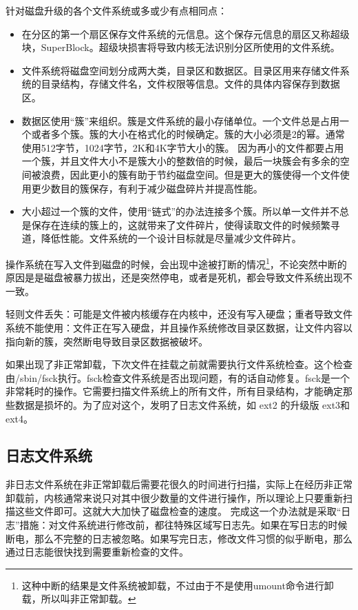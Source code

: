针对磁盘升级的各个文件系统或多或少有点相同点：
\begin{itemize}
\item 在分区的第一个扇区保存文件系统的元信息。这个保存元信息的扇区又称超级块，SuperBlock。超级块损害将导致内核无法识别分区所使用的文件系统。
\item 文件系统将磁盘空间划分成两大类，目录区和数据区。目录区用来存储文件系统的目录结构，存储文件名，文件权限等信息。文件的具体内容保存到数据区。
\item 数据区使用“簇”来组织。簇是文件系统的最小存储单位。一个文件总是占用一个或者多个簇。簇的大小在格式化的时候确定。簇的大小必须是2的幂。通常使用512字节，1024字节，2K和4K字节大小的簇。
因为再小的文件都要占用一个簇，并且文件大小不是簇大小的整数倍的时候，最后一块簇会有多余的空间被浪费，因此更小的簇有助于节约磁盘空间。但是更大的簇使得一个文件使用更少数目的簇保存，有利于减少磁盘碎片并提高性能。
\item 大小超过一个簇的文件，使用“链式”的办法连接多个簇。所以单一文件并不总是保存在连续的簇上的，这就带来了文件碎片，使得读取文件的时候频繁寻道，降低性能。文件系统的一个设计目标就是尽量减少文件碎片。
\end{itemize}

操作系统在写入文件到磁盘的时候，会出现中途被打断的情况\footnote{这种中断的结果是文件系统被卸载，不过由于不是使用umount命令进行卸载，所以叫非正常卸载。}，不论突然中断的原因是是磁盘被暴力拔出，还是突然停电，或者是死机，都会导致文件系统出现不一致。

轻则文件丢失：可能是文件被内核缓存在内核中，还没有写入硬盘；重者导致文件系统不能使用：文件正在写入硬盘，并且操作系统修改目录区数据，让文件内容以指向新的簇，突然断电导致目录区数据被破坏。

如果出现了非正常卸载，下次文件在挂载之前就需要执行文件系统检查。这个检查由/sbin/fsck执行。fsck检查文件系统是否出现问题，有的话自动修复。fsck是一个非常耗时的操作。它需要扫描文件系统上的所有文件，所有目录结构，才能确定那些数据是损坏的。为了应对这个，发明了日志文件系统，如 ext2 的升级版 ext3和ext4。

\subsection{日志文件系统}

非日志文件系统在非正常卸载后需要花很久的时间进行扫描，实际上在经历非正常卸载前，内核通常来说只对其中很少数量的文件进行操作，所以理论上只要重新扫描这些文件即可。这就大大加快了磁盘检查的速度。
完成这一个办法就是采取“日志”措施：对文件系统进行修改前，都往特殊区域写日志先。如果在写日志的时候断电，那么不完整的日志被忽略。如果写完日志，修改文件习惯的似乎断电，那么通过日志能很快找到需要重新检查的文件。

